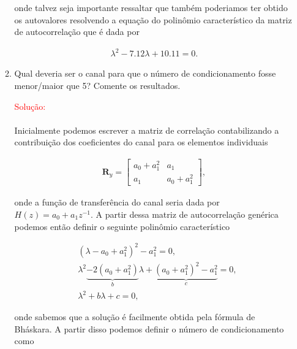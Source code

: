 \documentclass[a4paper,10pt]{article}
\begin{document}
\begin{enumerate}
\begin{enumerate}
						onde talvez seja importante ressaltar que também poderiamos ter obtido os autovalores resolvendo a equação do polinômio
						característico da matriz de autocorrelação que é dada por

						\begin{align}
							\lambda^{2} - 7.12 \lambda + 10.11 = 0. 
						\end{align}

					\item Qual deveria ser o canal para que o número de condicionamento fosse menor/maior que 5?
					Comente os resultados.
					
						\textcolor{red}{Solução:}
						
						\paragraph{}Inicialmente podemos escrever a matriz de correlação contabilizando a contribuição dos coeficientes do canal para os elementos individuais
						
						\begin{align}
							\mathbf{R}_{y} =
							\begin{bmatrix}
								a_{0} + a^{2}_{1} & a_{1}\\
								a_{1} & a_{0} + a^{2}_{1}
							\end{bmatrix},
						\end{align}

						onde a função de transferência do canal seria dada por $H(z) = a_{0} + a_{1}z^{-1}$. A partir dessa matriz de autocorrelação genérica podemos então 
						definir o seguinte polinômio característico

						\begin{align}
							&(\lambda - a_{0} + a^{2}_{1})^{2} - a^{2}_{1} = 0, \\
							&\lambda^{2} \underbrace{- 2 (a_{0} + a^{2}_{1})}_{b} \lambda + \underbrace{(a_{0} + a^{2}_{1})^{2} - a^{2}_{1}}_{c} = 0, \\
							&\lambda^{2} + b \lambda + c = 0,
						\end{align}

						onde sabemos que a solução é facilmente obtida pela fórmula de Bháskara. A partir disso podemos definir o número de condicionamento como


\end{enumerate}
\end{enumerate}
\end{document}
